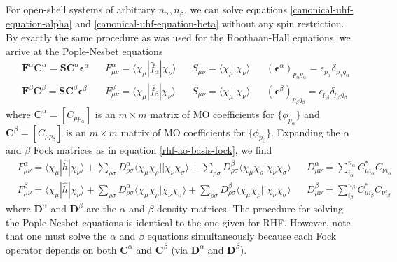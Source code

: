 \documentclass[11pt,fleqn]{article}
\renewcommand{\a}{\alpha}    %
\renewcommand{\b}{\beta}     %
\renewcommand{\d}{\delta}    %
\newcommand{\ev}{\epsilon}   %
\newcommand{\si}{\sigma}     %
\newcommand{\f}{\phi}        %
\newcommand{\x}{\chi}        %
\newcommand{\op}[1]{\ensuremath{\hat{#1}}}
\newcommand{\bo}[1]{\ensuremath{\mathbf{#1}}}
\newcommand{\ip}[1]{\ensuremath{\langle#1\rangle}}
\theoremstyle{mystyle}
\begin{document}
For open-shell systems of arbitrary $n_\a, n_\b$, we can solve equations \ref{canonical-uhf-equation-alpha} and \ref{canonical-uhf-equation-beta} without any spin restriction.
By exactly the same procedure as was used for the Roothaan-Hall equations, we arrive at the Pople-Nesbet equations
\begin{align*}
&
  \bo{F}^\a\bo{C}^\a
=
  \bo{S}\bo{C}^\a\bm\ev^\a
&&
  F_{\mu\nu}^\a
=
  \ip{\x_\mu|\op{f}_\a|\x_\nu}
&&
  S_{\mu\nu}
=
  \ip{\x_\mu|\x_\nu}
&&
  (\bm\ev^\a)_{p_\a q_\a}
=
  \ev_{p_\a}\d_{p_\a q_\a}
\\
&
  \bo{F}^\b\bo{C}^\b
=
  \bo{S}\bo{C}^\b\bm\ev^\b
&&
  F_{\mu\nu}^\b
=
  \ip{\x_\mu|\op{f}_\b|\x_\nu}
&&
  S_{\mu\nu}
=
  \ip{\x_\mu|\x_\nu}
&&
  (\bm\ev^\b)_{p_\b q_\b}
=
  \ev_{p_\b}\d_{p_\b q_\b}
\end{align*}
where $\bo{C}^\a=[C_{\mu p_\a}]$ is an $m\times m$ matrix of MO coefficients for $\{\f_{p_\a}\}$ and $\bo{C}^\b=[C_{\mu p_\b}]$ is an $m\times m$ matrix of MO coefficients for $\{\f_{p_\b}\}$.
Expanding the $\a$ and $\b$ Fock matrices as in equation \ref{rhf-ao-basis-fock}, we find
\begin{align*}
&
  F_{\mu\nu}^\a
=
  \ip{\x_\mu|\op{h}|\x_\nu}
+
  \sum_{\rho\si}
  D_{\rho\si}^\a
  \ip{\x_\mu\x_\rho||\x_\nu\x_\si}
+
  \sum_{\rho\si}
  D_{\rho\si}^\b
  \ip{\x_\mu\x_\rho|\x_\nu\x_\si}
&&
  D_{\mu\nu}^\a
=
  \sum_{i_\a}^{n_\a} C_{\mu i_\a}^*C_{\nu i_\a}
\\
&
  F_{\mu\nu}^\b
=
  \ip{\x_\mu|\op{h}|\x_\nu}
+
  \sum_{\rho\si}
  D_{\rho\si}^\a
  \ip{\x_\mu\x_\rho|\x_\nu\x_\si}
+
  \sum_{\rho\si}
  D_{\rho\si}^\b
  \ip{\x_\mu\x_\rho||\x_\nu\x_\si}
&&
  D_{\mu\nu}^\b
=
  \sum_{i_\b}^{n_\b} C_{\mu i_\b}^*C_{\nu i_\b}
\end{align*}
where $\bo{D}^\a$ and $\bo{D}^\b$ are the $\a$ and $\b$ density matrices.
The procedure for solving the Pople-Nesbet equations is identical to the one given for RHF.
However, note that one must solve the $\a$ and $\b$ equations simultaneously because each Fock operator depends on both $\bo{C}^\a$ and $\bo{C}^\b$ (via $\bo{D}^\a$ and $\bo{D}^\b$).
\end{document}
